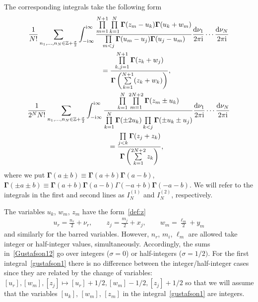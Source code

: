 The corresponding integrals take the following form~\cite{Derkachov:2016ucn,Derkachov:2017pvx}
\begin{subequations}\label{Gustafson12}
\begin{gather}
\frac1{N!} \sum_{n_1,\dots,n_N\in\mathbb{Z}+\frac{\sigma}{2}}
\int_{-{\rm i}\infty}^{{\rm i}\infty}
\frac{\prod\limits_{m=1}^{N+1}\prod\limits_{k=1}^{N}
\boldsymbol{\Gamma}(z_m-u_k)\boldsymbol{\Gamma}(u_k+w_m)}{ \prod\limits_{m<j}
\boldsymbol{\Gamma}(u_m- u_j)\boldsymbol{\Gamma}(u_j- u_m)}
\frac{{\rm d}\nu_1}{2\pi {\rm i}}\cdots\frac{{\rm d}\nu_N}{2\pi {\rm i}}\nonumber\\
\qquad{} =\frac{\prod\limits_{k,j=1}^{N+1}\boldsymbol{\Gamma}(z_k+ w_j)}{
\boldsymbol{\Gamma}\left(\sum\limits_{k=1}^{N+1} (z_k+w_k) \right)},\label{gustafson1}\\
\frac1{2^{N}N!}\sum_{n_1,\dots,n_N\in\mathbb{Z}+\frac{\sigma}{2}}
\int_{-{\rm i}\infty}^{{\rm i}\infty}
\frac{ \prod\limits_{k=1}^{N} \prod\limits_{m=1}^{2N+2}
 \boldsymbol{\Gamma}(z_m\pm u_k)}
{\prod\limits_{k=1}^{N}{\boldsymbol{\Gamma}}(\pm 2u_k) \prod\limits_{ k<j} {\boldsymbol{\Gamma}} (\pm u_k\pm u_j)
}\frac{{\rm d}\nu_1}{2\pi {\rm i}}\cdots\frac{{\rm d}\nu_N}{2\pi {\rm i}}\nonumber\\
\qquad{} = \frac{\prod\limits_{j<k}{\boldsymbol{\Gamma}}(z_j + z_k)}{{\boldsymbol{\Gamma}}\left(\sum\limits_{k=1}^{2N+2} z_k\right)}, \label{gustafson2}
\end{gather}
\end{subequations}
where we put $\boldsymbol \Gamma(a\pm b)\equiv \boldsymbol \Gamma(a+b) \boldsymbol \Gamma(a-b)$, $\boldsymbol
\Gamma(\pm a\pm b)\equiv \boldsymbol \Gamma(a+b) \boldsymbol \Gamma(a-b)\Gamma(-a+b) \boldsymbol \Gamma(-a-b)$. We will
refer to the integrals in the first and second lines as $I_N^{(1)}$ and $I_N^{(2)}$, respectively.

The variables $u_k$, $w_m$, $z_m$ have the form~\eqref{def:z}
\begin{gather*}
u_r=\frac{n_r}2+ \nu_r, \qquad z_j=\frac{m_j}2+ x_j, \qquad w_m=\frac{\ell_m}2+ y_m
\end{gather*}
and similarly for the barred variables. However, $n_r$, $m_i$, $\ell_m$ are allowed take integer or half-integer values,
simultaneously. Accordingly, the sums in~\eqref{Gustafson12} go over integers ($\sigma=0$) or half-integers
($\sigma=1/2)$. For the first integral~\eqref{gustafson1} there is no difference between the integer/half-integer cases
since they are related by the change of variables: $[u_r], [w_m], [z_j] \mapsto [u_r]+1/2, [w_m]-1/2,[z_j]+1/2$ so that we will assume that the variables $[u_k]$, $[w_m]$, $[z_m]$ in the integral~\eqref{gustafson1} are integers.

